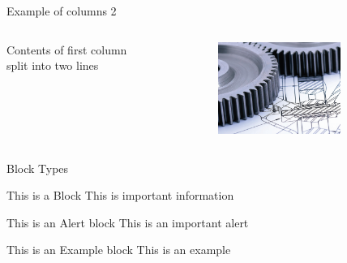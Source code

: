 \documentclass{beamer}
\begin{document}
\begin{frame}{Example of columns 2}
     \begin{columns}[t] %
     \begin{column}[T]{5cm} %
     Contents of first column \\ split into two lines
     \end{column}
     \begin{column}[T]{5cm} %
          \includegraphics[height=3cm]{images/engineering.jpg}
     \end{column}
     \end{columns}
\end{frame}

\begin{frame}{Block Types}
   \begin{block}{This is a Block}
      This is important information
   \end{block}
 
   \begin{alertblock}{This is an Alert block}
   This is an important alert
   \end{alertblock}
 
   \begin{exampleblock}{This is an Example block}
   This is an example 
   \end{exampleblock}
\end{frame}
\end{document}
